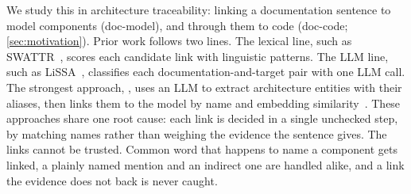 We study this in architecture traceability: linking a documentation sentence to model components (doc-model), and through them to code (doc-code; \autoref{sec:motivation}).
Prior work follows two lines.
The lexical line, such as SWATTR~\cite{keim_trace_2021}, scores each candidate link with linguistic patterns.
The \ac{LLM} line, such as LiSSA~\cite{fuchs_lissa_2025}, classifies each documentation-and-target pair with one \ac{LLM} call.
The strongest approach, \Artemis, uses an \ac{LLM} to extract architecture entities with their aliases, then links them to the model by name and embedding similarity~\cite{fuchs_whos_2025}.
These approaches share one root cause: each link is decided in a single unchecked step, by matching names rather than weighing the evidence the sentence gives.
The links cannot be trusted.
 Common word that happens to name a component gets linked, a plainly named mention and an indirect one are handled alike, and a link the evidence does not back is never caught.

